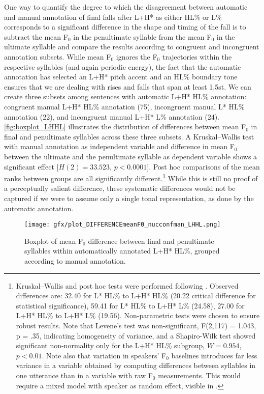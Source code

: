 One way to quantify the degree to which the disagreement between automatic and manual annotation of final falls after L+H* as either HL\% or L\% corresponds to a significant difference in the shape and timing of the fall is to subtract the mean F$_0$ in the penultimate syllable from the mean F$_0$ in the ultimate syllable and compare the results according to congruent and incongruent annotation subsets. While mean F$_0$ ignores the F$_0$ trajectories within the respective syllables (and again periodic energy), the fact that the automatic annotation has selected an L+H* pitch accent and an HL\% boundary tone ensures that we are dealing with rises and falls that span at least 1.5st. We can create three subsets among sentences with automatic L+H* HL\% annotation: congruent manual L+H* HL\% annotation (75), incongruent manual L* HL\% annotation (22), and incongruent manual L+H* L\% annotation (24). \autoref{fig:boxplot_LHHL} illustrates the distribution of differences between mean F$_0$ in final and penultimate syllables across these three subsets. A Kruskal–Wallis test with manual annotation as independent variable and difference in mean F$_0$ between the ultimate and the penultimate syllable as dependent variable shows a significant effect [$H(2) = 33.523$, $p<0.0001$]. Post hoc comparisons of the mean ranks between groups are all significantly different.\footnote{Kruskal–Wallis and post hoc tests were performed following \citet[674--684]{FieldMilesField.2012}. Observed differences are: 32.40 for L* HL\% to L+H* HL\%  (20.22 critical difference for statistical significance), 59.41 for L* HL\% to L+H* L\% (24.58), 27.00 for L+H* HL\% to L+H* L\% (19.56). Non-parametric tests were chosen to ensure robust results. Note that Levene’s test was non-significant, F(2,117) = 1.043, p = .35, indicating homogeneity of variance, and a Shapiro-Wilk test showed significant non-normality only for the L+H* HL\% subgroup, $W = 0.954$, $p<0.01$. Note also that variation in speakers' F$_0$ baselines introduces far less variance in a variable obtained by computing differences between syllables in one utterance than in a variable with raw F$_0$ measurements. This would require a mixed model with speaker as random effect, visible in .} While this is still no proof of a perceptually salient difference, these systematic differences would not be captured if we were to assume only a single tonal representation, as done by the automatic annotation.

\begin{figure}
	\texttt{[image: gfx/plot\_DIFFERENCEmeanF0\_nucconfman\_LHHL.png]}
	\caption[Boxplot of mean F$_0$ difference between final and penultimate syllables within automatically annotated L+H* HL\%, grouped according to manual annotation]{Boxplot of mean F$_0$ difference between final and penultimate syllables within automatically annotated L+H* HL\%, grouped according to manual annotation.}\label{fig:boxplot_LHHL}
\end{figure}

